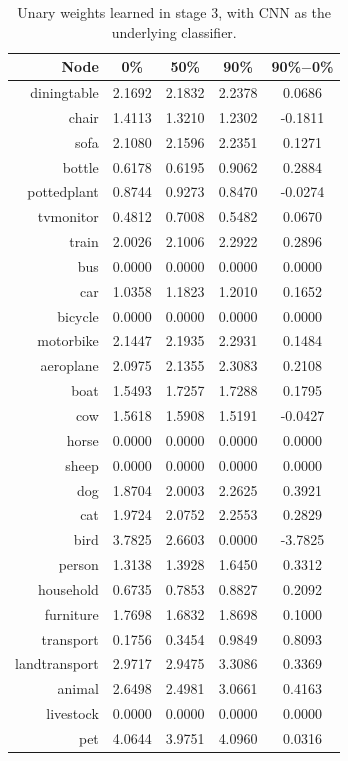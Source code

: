 \documentclass[11pt,a4paper]{article}
\begin{document}
\begin{table}[htbp]
\centering
\begin{tabular}{r|c|c|c|c}
Node & 0\% & 50\% & 90\% & 90\%$-$0\%\\\hline
diningtable   & 2.1692 & 2.1832 & 2.2378 & 0.0686\\
chair         & 1.4113 & 1.3210 & 1.2302 & -0.1811\\
sofa          & 2.1080 & 2.1596 & 2.2351 & 0.1271\\
bottle        & 0.6178 & 0.6195 & 0.9062 & 0.2884\\
pottedplant   & 0.8744 & 0.9273 & 0.8470 & -0.0274\\
tvmonitor     & 0.4812 & 0.7008 & 0.5482 & 0.0670\\
train         & 2.0026 & 2.1006 & 2.2922 & 0.2896\\
bus           & 0.0000 & 0.0000 & 0.0000 & 0.0000\\
car           & 1.0358 & 1.1823 & 1.2010 & 0.1652\\
bicycle       & 0.0000 & 0.0000 & 0.0000 & 0.0000\\
motorbike     & 2.1447 & 2.1935 & 2.2931 & 0.1484\\
aeroplane     & 2.0975 & 2.1355 & 2.3083 & 0.2108\\
boat          & 1.5493 & 1.7257 & 1.7288 & 0.1795\\
cow           & 1.5618 & 1.5908 & 1.5191 & -0.0427\\
horse         & 0.0000 & 0.0000 & 0.0000 & 0.0000\\
sheep         & 0.0000 & 0.0000 & 0.0000 & 0.0000\\
dog           & 1.8704 & 2.0003 & 2.2625 & 0.3921\\
cat           & 1.9724 & 2.0752 & 2.2553 & 0.2829\\
bird          & 3.7825 & 2.6603 & 0.0000 & -3.7825\\
person        & 1.3138 & 1.3928 & 1.6450 & 0.3312\\\hline
household     & 0.6735 & 0.7853 & 0.8827 & 0.2092\\
furniture     & 1.7698 & 1.6832 & 1.8698 & 0.1000\\
transport     & 0.1756 & 0.3454 & 0.9849 & 0.8093\\
landtransport & 2.9717 & 2.9475 & 3.3086 & 0.3369\\
animal        & 2.6498 & 2.4981 & 3.0661 & 0.4163\\
livestock     & 0.0000 & 0.0000 & 0.0000 & 0.0000\\
pet           & 4.0644 & 3.9751 & 4.0960 & 0.0316
\end{tabular}
\caption{Unary weights learned in stage 3, with CNN as the underlying classifier.}
\label{tab:cnnunary}
\end{table}
\end{document}
